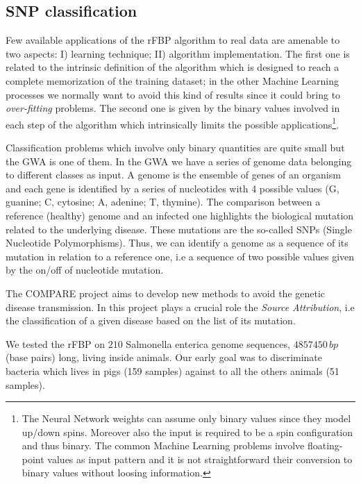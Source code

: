 \documentclass{standalone}
\begin{document}
\subsection[Compare dataset]{SNP classification}\label{rfbp:snp}

Few available applications of the \textsf{rFBP} algorithm to real data are amenable to two aspects: I) learning technique; II) algorithm implementation.
The first one is related to the intrinsic definition of the algorithm which is designed to reach a complete memorization of the training dataset; in the other Machine Learning processes we normally want to avoid this kind of results since it could bring to \emph{over-fitting} problems.
The second one is given by the binary values involved in each step of the algorithm which intrinsically limits the possible applications\footnote{
  The Neural Network weights can assume only binary values since they model up/down spins.
  Moreover also the input is required to be a spin configuration and thus binary.
  The common Machine Learning problems involve floating-point values as input pattern and it is not straightforward their conversion to binary values without loosing information.
}.

Classification problems which involve only binary quantities are quite small but the GWA is one of them.
In the GWA we have a series of genome data belonging to different classes as input.
A genome is the ensemble of genes of an organism and each gene is identified by a series of nucleotides with 4 possible values (G, guanine; C, cytosine; A, adenine; T, thymine).
The comparison between a reference (healthy) genome and an infected one highlights the biological mutation related to the underlying disease.
These mutations are the so-called SNPs (Single Nucleotide Polymorphisms).
Thus, we can identify a genome as a sequence of its mutation in relation to a reference one, i.e a sequence of two possible values given by the on/off of nucleotide mutation.

The COMPARE project aims to develop new methods to avoid the genetic disease transmission.
In this project plays a crucial role the \emph{Source Attribution}, i.e the classification of a given disease based on the list of its mutation.

We tested the \textsf{rFBP} on $210$ Salmonella enterica genome sequences, $4857450\,bp$ (base pairs) long, living inside animals.
Our early goal was to discriminate bacteria which lives in pigs (159 samples) against to all the others animals (51 samples).
\end{document}
